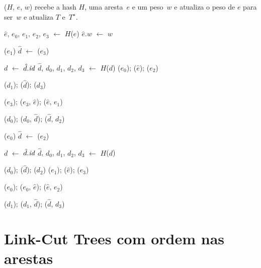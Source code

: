 \MSFupdate($H$, $e$, $w$) recebe a hash $H$, uma aresta~$e$ e um peso~$w$ e atualiza o peso de $e$ para ser~$w$ e atualiza $T$ e~$T^\star$.

\begin{algorithm}[htb]
\caption{\MSFupdate($H$, $e$, $w$)}
\label{Algo:MSFupdate}
\begin{algorithmic}[1]
\State $\hat e$, $e_0$, $e_1$, $e_2$, $e_3$ $\gets$ $H$($e$)
\State $\hat e.w$ $\gets$ $w$
\label{Algo:MSFupdate:linhauvinF}

\State \linkcutEvert($e_1$)
\State $\hat d$ $\gets$ \linkcutMin($e_3$)

\State \Return
\EndIf
\State $d$ $\gets$ $\hat d.\textit{id}$
\State $\hat d$, $d_0$, $d_1$, $d_2$, $d_3$ $\gets$ $H$($d$)
\State \linkcutEvert($e_0$); \linkcutDelEdge($\hat e$); \linkcutDelEdge($e_2$)

\State \linkcutEvert($d_1$); \linkcutDelEdge($\hat d$); \linkcutDelEdge($d_3$)

\State \linkcutEvert($e_3$); \linkcutAddEdge($e_3$, $\hat e$); \linkcutAddEdge($\hat e$, $e_1$)

\State \linkcutEvert($d_0$); \linkcutAddEdge($d_0$, $\hat d$); \linkcutAddEdge($\hat d$, $d_2$)
\EndIf

\Else

\State \linkcutEvert($e_0$)
\State $\hat d$ $\gets$ \linkcutMax($e_2$)

\State \Return
\EndIf
\State $d$ $\gets$ $\hat d.\textit{id}$
\State $\hat d$, $d_0$, $d_1$, $d_2$, $d_3$ $\gets$ $H$($d$)

\State \linkcutEvert($d_0$); \linkcutDelEdge($\hat d$); \linkcutDelEdge($d_2$)
\State \linkcutEvert($e_1$); \linkcutDelEdge($\hat e$); \linkcutDelEdge($e_3$)

\State \linkcutEvert($e_0$); \linkcutAddEdge($e_0$, $\hat e$); \linkcutAddEdge($\hat e$, $e_2$)

\State \linkcutEvert($d_1$); \linkcutAddEdge($d_1$, $\hat d$); \linkcutAddEdge($\hat d$, $d_3$)

\EndIf
\EndIf
\end{algorithmic}
\end{algorithm}

\newpage
\section{Link-Cut Trees com ordem nas arestas}


